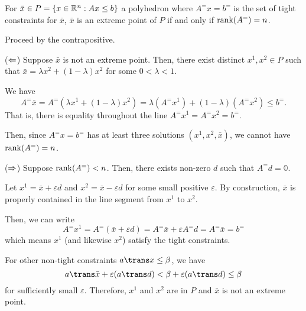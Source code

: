 \begin{theorem}\label{thm:xp-r}
  For $\bar x \in P = \{x \in \mathbb{R}^n : Ax \leq b\}$ a polyhedron
  where $A^=x = b^=$ is the set of tight constraints for $\bar x$,
  $\bar x$ is an extreme point of $P$ if and only if $\rank(A^=) = n$.
\end{theorem}
\begin{prf}
  Proceed by the contrapositive.

  ($\Leftarrow$) Suppose $\bar x$ is not an extreme point.
  Then, there exist distinct $x^1, x^2 \in P$ such that
  $\bar x = \lambda x^2 + (1-\lambda)x^2$ for some $0 < \lambda < 1$.

  We have
  \[ A^= \bar x = A^=(\lambda x^1 + (1-\lambda)x^2) = \lambda(A^= x^1) + (1-\lambda)(A^= x^2) \leq b^=. \]
  That is, there is equality throughout the line $A^= x^1 = A^= x^2 = b^=$.

  Then, since $A^= x = b^=$ has at least three solutions $(x^1, x^2, \bar x)$,
  we cannot have $\rank(A^=) = n$.

  ($\Rightarrow$) Suppose $\rank(A^=) < n$.
  Then, there exists non-zero $d$ such that $A^= d = \mathbb 0$.

  Let $x^1 = \bar x + \varepsilon d$ and $x^2 = \bar x - \varepsilon d$
  for some small positive $\varepsilon$.
  By construction, $\bar x$ is properly contained in the line segment from $x^1$ to $x^2$.

  Then, we can write
  \[ A^= x^1 = A^=(\bar x + \varepsilon d) = A^= \bar x + \varepsilon A^= d = A^= \bar x = b^= \]
  which means $x^1$ (and likewise $x^2$) satisfy the tight constraints.

  For other non-tight constraints $a\trans x \leq \beta$, we have
  \[ a\trans \bar x + \varepsilon(a\trans d) < \beta + \varepsilon(a\trans d) \leq \beta \]
  for sufficiently small $\varepsilon$.
  Therefore, $x^1$ and $x^2$ are in $P$ and $\bar x$ is not an extreme point.
\end{prf}

